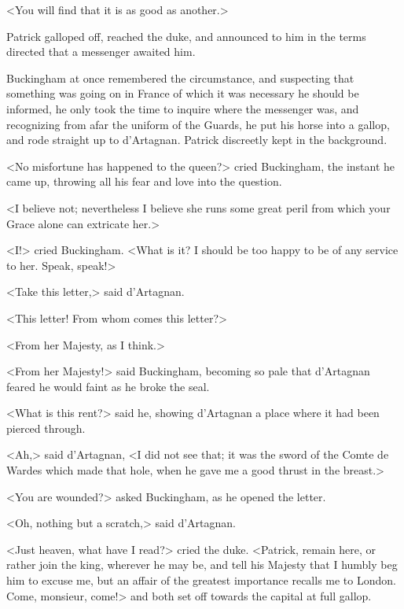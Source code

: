 <You will find that it is as good as another.> 

Patrick galloped off, reached the duke, and announced to him in the terms directed that a messenger awaited him. 

Buckingham at once remembered the circumstance, and suspecting that something was going on in France of which it was necessary he should be informed, he only took the time to inquire where the messenger was, and recognizing from afar the uniform of the Guards, he put his horse into a gallop, and rode straight up to d'Artagnan. Patrick discreetly kept in the background. 

<No misfortune has happened to the queen?> cried Buckingham, the instant he came up, throwing all his fear and love into the question. 

<I believe not; nevertheless I believe she runs some great peril from which your Grace alone can extricate her.> 

<I!> cried Buckingham. <What is it? I should be too happy to be of any service to her. Speak, speak!> 

<Take this letter,> said d'Artagnan. 

<This letter! From whom comes this letter?> 

<From her Majesty, as I think.> 

<From her Majesty!> said Buckingham, becoming so pale that d'Artagnan feared he would faint as he broke the seal. 

<What is this rent?> said he, showing d'Artagnan a place where it had been pierced through. 

<Ah,> said d'Artagnan, <I did not see that; it was the sword of the Comte de Wardes which made that hole, when he gave me a good thrust in the breast.> 

<You are wounded?> asked Buckingham, as he opened the letter. 

<Oh, nothing but a scratch,> said d'Artagnan. 

<Just heaven, what have I read?> cried the duke. <Patrick, remain here, or rather join the king, wherever he may be, and tell his Majesty that I humbly beg him to excuse me, but an affair of the greatest importance recalls me to London. Come, monsieur, come!> and both set off towards the capital at full gallop.
